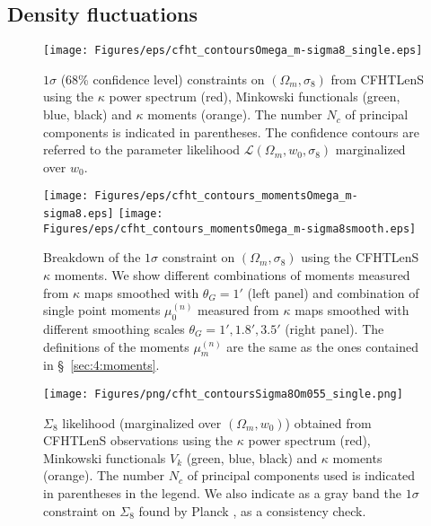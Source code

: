 \subsection{Density fluctuations}
%
\begin{figure}
\begin{center}
\texttt{[image: Figures/eps/cfht\_contoursOmega\_m-sigma8\_single.eps]}
\end{center}
\caption{$1\sigma$ (68\% confidence level) constraints on $(\Omega_m,\sigma_8)$ from CFHTLenS using the $\kappa$ power spectrum (red), Minkowski functionals (green, blue, black) and $\kappa$ moments (orange). The number $N_c$ of principal components is indicated in parentheses. The confidence contours are referred to the parameter likelihood $\mathcal{L}(\Omega_m,w_0,\sigma_8)$ marginalized over $w_0$.}
\label{fig:6:cOmSisingle}
\end{figure}
%
\begin{figure}
\begin{center}
\texttt{[image: Figures/eps/cfht\_contours\_momentsOmega\_m-sigma8.eps]} \texttt{[image: Figures/eps/cfht\_contours\_momentsOmega\_m-sigma8smooth.eps]}
\end{center}
\caption{Breakdown of the $1\sigma$ constraint on $(\Omega_m,\sigma_8)$ using the CFHTLenS $\kappa$ moments. We show different combinations of moments measured from $\kappa$ maps smoothed with $\theta_G=1'$ (left panel) and combination of single point moments $\mu_0^{(n)}$ measured from $\kappa$ maps smoothed with different smoothing scales $\theta_G=1',1.8',3.5'$ (right panel). The definitions of the moments $\mu_m^{(n)}$ are the same as the ones contained in \S~\ref{sec:4:moments}.}
\label{fig:6:cOmSimoments}
\end{figure}
%
\begin{figure}
\begin{center}
\texttt{[image: Figures/png/cfht\_contoursSigma8Om055\_single.png]}
\end{center}
\caption{$\Sigma_8$ likelihood (marginalized over $(\Omega_m,w_0)$) obtained from CFHTLenS observations using the $\kappa$ power spectrum (red), Minkowski functionals $V_k$ (green, blue, black) and $\kappa$ moments (orange). The number $N_c$ of principal components used is indicated in parentheses in the legend. We also indicate as a gray band the $1\sigma$ constraint on $\Sigma_8$ found by Planck \citep{Planck15}, as a consistency check.}
\label{fig:6:cSi855}
\end{figure}
%
